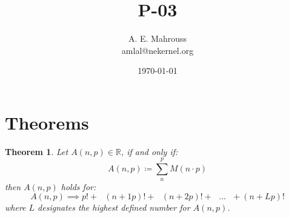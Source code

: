 \documentclass{article}
\title{P-03}
\author{A. E. Mahrouss\\amlal@nekernel.org}
\date{\today}
\theoremstyle{plain}
\newtheorem{theorem}{Theorem}[section]
\theoremstyle{definition}
\theoremstyle{remark}
\begin{document}
\maketitle

\section{Theorems}

\begin{theorem}
Let $A(n, p) \in \mathbb{R}$, if and only if:
\begin{equation}
    A(n, p) \coloneq \sum_{n}^{p} M(n \cdot p)
\end{equation}
then $A(n, p)$ holds for:
\begin{equation}
    A(n, p) \implies p! + \text{ } (n+1p)! + \text{ } (n+2p)! + \text{ } \dots \text{ } + (n+Lp)! 
\end{equation}
where $L$ designates the highest defined number for $A(n, p)$.
\end{theorem}
\end{document}

